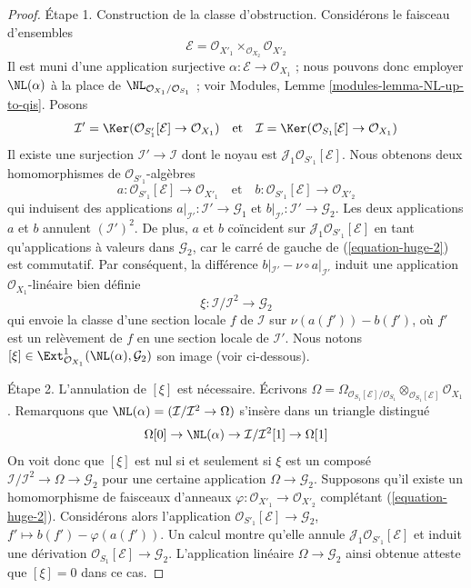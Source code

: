 \begin{proof}
\medskip\noindent
Étape 1. Construction de la classe d'obstruction. Considérons le faisceau
d'ensembles
$$
\mathcal{E} = \mathcal{O}_{X'_1} \times_{\mathcal{O}_{X_2}} \mathcal{O}_{X'_2}
$$
Il est muni d'une application surjective
$\alpha : \mathcal{E} \to \mathcal{O}_{X_1}$ ; nous pouvons donc employer
$\NL(\alpha)$ à la place de
$\NL_{\mathcal{O}_{X_1}/\mathcal{O}_{S_1}}$ ; voir Modules, Lemme
\ref{modules-lemma-NL-up-to-qis}.
Posons
$$
\mathcal{I}' =
\Ker(\mathcal{O}_{S'_1}[\mathcal{E}] \to \mathcal{O}_{X_1})
\quad\text{et}\quad
\mathcal{I} =
\Ker(\mathcal{O}_{S_1}[\mathcal{E}] \to \mathcal{O}_{X_1})
$$
Il existe une surjection $\mathcal{I}' \to \mathcal{I}$ dont le noyau est
$\mathcal{J}_1\mathcal{O}_{S'_1}[\mathcal{E}]$.
Nous obtenons deux homomorphismes de $\mathcal{O}_{S'_1}$-algèbres
$$
a : \mathcal{O}_{S'_1}[\mathcal{E}] \to \mathcal{O}_{X'_1}
\quad\text{et}\quad
b : \mathcal{O}_{S'_1}[\mathcal{E}] \to \mathcal{O}_{X'_2}
$$
qui induisent des applications
$a|_{\mathcal{I}'} : \mathcal{I}' \to \mathcal{G}_1$ et
$b|_{\mathcal{I}'} : \mathcal{I}' \to \mathcal{G}_2$.
Les deux applications $a$ et $b$ annulent $(\mathcal{I}')^2$.
De plus, $a$ et $b$ coïncident sur
$\mathcal{J}_1\mathcal{O}_{S'_1}[\mathcal{E}]$ en tant qu'applications à
valeurs dans $\mathcal{G}_2$, car le carré de gauche de
(\ref{equation-huge-2}) est commutatif. Par conséquent, la différence
$b|_{\mathcal{I}'} - \nu \circ a|_{\mathcal{I}'}$
induit une application $\mathcal{O}_{X_1}$-linéaire bien définie
$$
\xi : \mathcal{I}/\mathcal{I}^2 \longrightarrow \mathcal{G}_2
$$
qui envoie la classe d'une section locale $f$ de $\mathcal{I}$ sur
$\nu(a(f')) - b(f')$, où $f'$ est un relèvement de $f$ en une section locale
de $\mathcal{I}'$. Nous notons
$[\xi] \in \Ext^1_{\mathcal{O}_{X_1}}(\NL(\alpha), \mathcal{G}_2)$
son image (voir ci-dessous).

\medskip\noindent
Étape 2. L'annulation de $[\xi]$ est nécessaire. Écrivons
$\Omega = \Omega_{\mathcal{O}_{S_1}[\mathcal{E}]/\mathcal{O}_{S_1}}
\otimes_{\mathcal{O}_{S_1}[\mathcal{E}]} \mathcal{O}_{X_1}$.
Remarquons que $\NL(\alpha) = (\mathcal{I}/\mathcal{I}^2 \to \Omega)$
s'insère dans un triangle distingué
$$
\Omega[0] \to
\NL(\alpha) \to
\mathcal{I}/\mathcal{I}^2[1] \to
\Omega[1]
$$
On voit donc que $[\xi]$ est nul si et seulement si $\xi$ est un composé
$\mathcal{I}/\mathcal{I}^2 \to \Omega \to \mathcal{G}_2$
pour une certaine application $\Omega \to \mathcal{G}_2$. Supposons qu'il
existe un homomorphisme de faisceaux d'anneaux
$\varphi : \mathcal{O}_{X'_1} \to \mathcal{O}_{X'_2}$ complétant
(\ref{equation-huge-2}). Considérons alors l'application
$\mathcal{O}_{S'_1}[\mathcal{E}] \to \mathcal{G}_2$,
$f' \mapsto b(f') - \varphi(a(f'))$. Un calcul montre qu'elle annule
$\mathcal{J}_1\mathcal{O}_{S'_1}[\mathcal{E}]$ et induit une dérivation
$\mathcal{O}_{S_1}[\mathcal{E}] \to \mathcal{G}_2$.
L'application linéaire $\Omega \to \mathcal{G}_2$ ainsi obtenue atteste que
$[\xi] = 0$ dans ce cas.


\end{proof}
